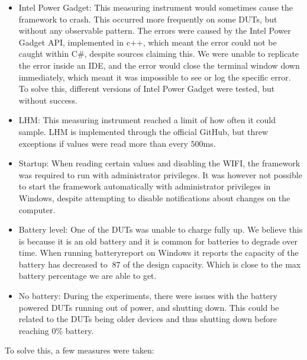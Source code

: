 \begin{itemize}
    \item Intel Power Gadget: This measuring instrument would sometimes cause the framework to crash. This occurred more frequently on some DUTs, but without any observable pattern. The errors were caused by the Intel Power Gadget API, implemented in c++, which meant the error could not be caught within C\#, despite sources claiming this\cite[]{cpp_exceptions}. We were unable to replicate the error inside an IDE, and the error would close the terminal window down immediately, which meant it was impossible to see or log the specific error. To solve this, different versions of Intel Power Gadget were tested, but without success. %
    \item LHM: This measuring instrument reached a limit of how often it could sample. LHM is implemented through the official GitHub, but threw exceptions if values were read more than every $500$ms.
    \item Startup: When reading certain values and disabling the WIFI, the framework was required to run with administrator privileges. It was however not possible to start the framework automatically with administrator privileges in Windows, despite attempting to disable notifications about changes on the computer. 
    \item Battery level: One of the DUTs was unable to charge fully up. We believe this is because it is an old battery and it is common for batteries to degrade over time. When running batteryreport on Windows it reports the capacity of the battery has decreased to $~87$ of the design capacity. Which is close to the max battery percentage we are able to get.
    \item No battery: During the experiments, there were issues with the battery powered DUTs running out of power, and shutting down. This could be related to the DUTs being older devices and thus shutting down before reaching 0\% battery.
\end{itemize}

To solve this, a few measures were taken:


